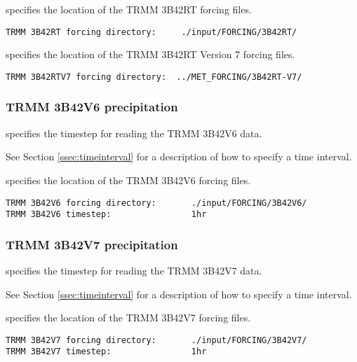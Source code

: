  
  specifies the location of the
 TRMM 3B42RT forcing files.
 

 \begin{Verbatim}[frame=single]
TRMM 3B42RT forcing directory:     ./input/FORCING/3B42RT/
 \end{Verbatim}

 
  specifies the location of the
 TRMM 3B42RT Version 7 forcing files.
 

 \begin{Verbatim}[frame=single]
TRMM 3B42RTV7 forcing directory:  ../MET_FORCING/3B42RT-V7/
 \end{Verbatim}

 
 \subsubsection{TRMM 3B42V6 precipitation} \label{sssec:supp_3b42v6}
 

 
  specifies the timestep for reading
 the TRMM 3B42V6 data.

 See Section \ref{ssec:timeinterval} for a description
 of how to specify a time interval.

  specifies the location of the
 TRMM 3B42V6 forcing files.
 

 \begin{Verbatim}[frame=single]
TRMM 3B42V6 forcing directory:       ./input/FORCING/3B42V6/
TRMM 3B42V6 timestep:                1hr
 \end{Verbatim}

 
 \subsubsection{TRMM 3B42V7 precipitation} \label{sssec:supp_3b42v7}
 

 
  specifies the timestep for reading
 the TRMM 3B42V7 data.

 See Section \ref{ssec:timeinterval} for a description
 of how to specify a time interval.

  specifies the location of the
 TRMM 3B42V7 forcing files.
 

 \begin{Verbatim}[frame=single]
TRMM 3B42V7 forcing directory:       ./input/FORCING/3B42V7/
TRMM 3B42V7 timestep:                1hr
 \end{Verbatim}

